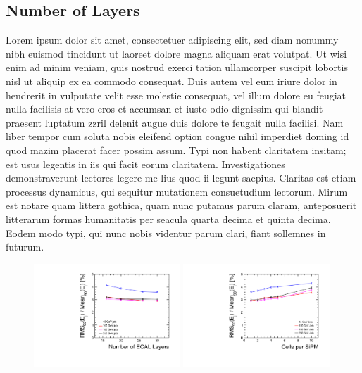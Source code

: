 \documentclass[final,3p,times,twocolumn]{elsarticle}
\begin{document}
\subsection{Number of Layers}
Lorem ipsum dolor sit amet, consectetuer adipiscing elit, sed diam nonummy nibh euismod tincidunt ut laoreet dolore magna aliquam erat volutpat. Ut wisi enim ad minim veniam, quis
nostrud exerci tation ullamcorper suscipit lobortis nisl ut aliquip ex ea commodo consequat. Duis autem vel eum iriure dolor in hendrerit in vulputate velit esse molestie consequat,
vel illum dolore eu feugiat nulla facilisis at vero eros et accumsan et iusto odio dignissim qui blandit praesent luptatum zzril delenit augue duis dolore te feugait nulla facilisi.
Nam liber tempor cum soluta nobis eleifend option congue nihil imperdiet doming id quod mazim placerat facer possim assum. Typi non habent claritatem insitam; est usus legentis in
iis qui facit eorum claritatem. Investigationes demonstraverunt lectores legere me lius quod ii legunt saepius. Claritas est etiam processus dynamicus, qui sequitur mutationem
consuetudium lectorum. Mirum est notare quam littera gothica, quam nunc putamus parum claram, anteposuerit litterarum formas humanitatis per seacula quarta decima et quinta
decima. Eodem modo typi, qui nunc nobis videntur parum clari, fiant sollemnes in futurum.

\begin{figure}[!h]
  \begin{center}
     \includegraphics[width=0.49\textwidth]{Res_vs_L_diffE_Photon.pdf}
     \includegraphics[width=0.49\textwidth]{Res_vs_M_diffE_Photon.pdf}
     \caption{\label{}}
  \end{center}
\end{figure}
\end{document}

